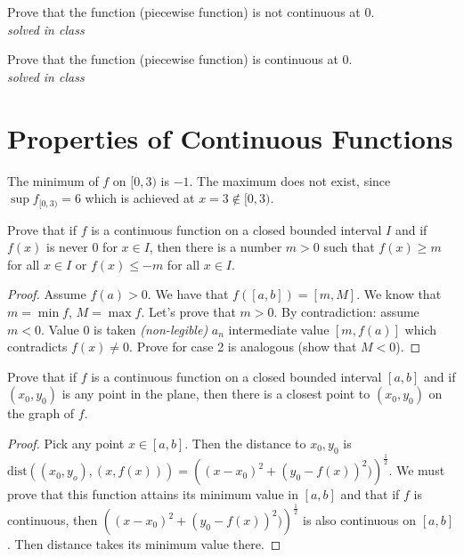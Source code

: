 \documentclass[12pt]{book}
\newenvironment{exercise}[2][Exercise]{\begin{trivlist}
\item[\hskip \labelsep {\bfseries #1}\hskip \labelsep {\bfseries #2.}]}{\end{trivlist}}
\begin{document}
\begin{exercise}{3.1.11}
Prove that the function (piecewise function) is not continuous at 0.\\

\emph{solved in class}
\end{exercise}

\begin{exercise}{3.1.12}
Prove that the function (piecewise function) is continuous at 0.\\

\emph{solved in class}
\end{exercise}


\section{Properties of Continuous Functions}

\begin{exercise}{3.2.1}
The minimum of $f$ on $[0, 3)$ is $-1$. The maximum does not exist, since $\sup f_{[0,3)} = 6$ which is achieved at $x=3 \not \in [0,3)$.
\end{exercise}

\begin{exercise}{3.2.2}
    Prove that if $f$ is a continuous function on a closed bounded interval $I$ and if $f(x)$ is never 0 for $x \in I$, then there is a number $m>0$ such that $f(x)\geq m$ for all $x \in I$ or $f(x) \leq -m$ for all $x \in I$.
    
    \begin{proof}
    Assume $f(a)>0$. We have that $f([a,b])=[m,M]$. We know that $m=\min f$, $M=\max f$. Let's prove that $m>0$. By contradiction: assume $m<0$. Value 0 is taken \emph{(non-legible)} $a_n$ intermediate value $[m, f(a)]$ which contradicts $f(x)\neq 0$. Prove for case 2 is analogous (show that $M <0$).
    \end{proof}
\end{exercise}

\begin{exercise}{3.2.3}
    Prove that if $f$ is a continuous function on a closed bounded interval $[a,b]$ and if $(x_0, y_0)$ is any point in the plane, then there is a closest point to $(x_0,y_0)$ on the graph of $f$. 
    
    \begin{proof}
    Pick any point $x \in [a,b]$. Then the distance to $x_0,y_0$ is $\text{dist}\left( (x_0,y_o), (x,f(x)) \right) = \left( (x-x_0)^2 + (y_0-f(x))^2)\right)^{\frac{1}{2}}$. We must prove that this function attains its minimum value in $[a,b]$ and that if $f$ is continuous, then $\left( (x-x_0)^2 + (y_0-f(x))^2)\right)^{\frac{1}{2}}$ is also continuous on $[a,b]$. Then distance takes its minimum value there.
    \end{proof}
\end{exercise}
\end{document}
